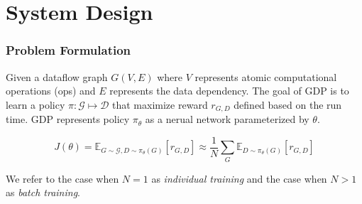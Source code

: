 \documentclass[12pt,aspectratio=169]{beamer}
\begin{document}
    \section{System Design}

    \begin{frame}
        \frametitle{Problem Formulation}

        Given a dataflow graph $G(V, E)$ where $V$ represents atomic computational operations (ops) and $E$ represents
        the data dependency. The goal of GDP is to learn a policy $\pi: \mathcal{G} \mapsto \mathcal{D}$ that maximize
        reward $r_{G,D}$ defined based on the run time. GDP represents policy $\pi_\theta$ as a nerual network
        parameterized by $\theta$.

        $$
            J(\theta) = \mathbb{E}_{G\sim{} \mathcal{G}, D\sim \pi_\theta(G)}[r_{G,D}] \approx
            \frac{1}{N}\sum_{G}\mathbb{E}_{D\sim \pi_\theta(G)}[r_{G,D}]
        $$

        We refer to the case when $N=1$ as \textit{individual training} and the case when $N>1$ as \textit{batch training}.
    \end{frame}

\end{document}
